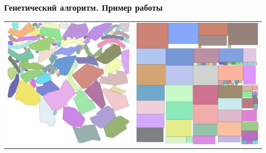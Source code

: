\documentclass[10pt, unicode]{beamer}
\begin{document}
    \begin{frame}
        \frametitle{Генетический алгоритм. Пример работы}
        \begin{table}[ht]
            \begin{center}
            \begin{tabular}{cc}
                \multirow{2}{*}[2cm]{\includegraphics[scale=0.08]{polygonal.png}}&\includegraphics[scale=0.08]{rect_0.png}\\

\end{tabular}
\end{center}
\end{table}
\end{frame}
\end{document}
